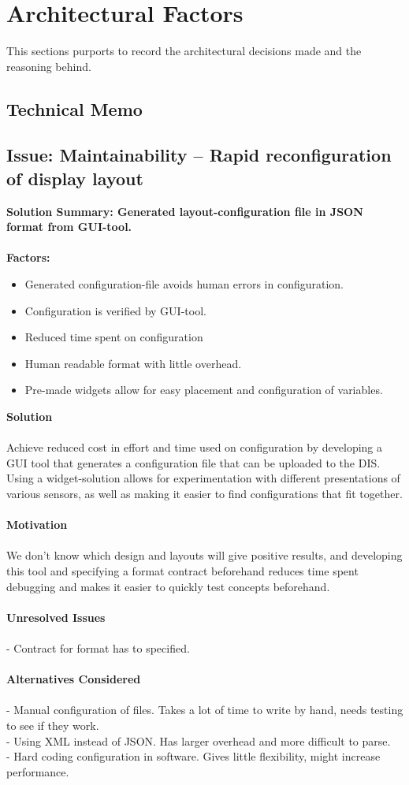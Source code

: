 
\section{Architectural Factors}

This sections purports to record the architectural decisions made and the
reasoning behind.

\subsection*{Technical Memo}
\subsection{Issue: Maintainability -- Rapid reconfiguration of display layout}
\textbf{Solution Summary: Generated layout-configuration file in JSON format
from GUI-tool.\\
\\
Factors:}
\begin{itemize}
\item Generated configuration-file avoids human errors in configuration.
\item Configuration is verified by GUI-tool.
\item Reduced time spent on configuration
\item Human readable format with little overhead.
\item Pre-made widgets allow for easy placement and configuration of variables.
\end{itemize}
\textbf{Solution}\\
\\
Achieve reduced cost in effort and time used on configuration by developing a
GUI tool that generates a configuration file that can be uploaded to the DIS.
Using a widget-solution allows for experimentation with different presentations
of various sensors, as well as making it easier to find configurations that fit
together.\\
\\
\textbf{Motivation}\\
\\
We don't know which design and layouts will give positive results, and
developing this tool and specifying a format contract beforehand reduces time 
spent debugging and makes it easier to quickly test concepts beforehand.\\
\\
\textbf{Unresolved Issues}\\
\\
- Contract for format has to specified.\\
\\
\textbf{Alternatives Considered}\\
\\
- Manual configuration of files. Takes a lot of time to write by hand, needs 
testing to see if they work.\\
- Using XML instead of JSON. Has larger overhead and more difficult to parse.\\
- Hard coding configuration in software. Gives little flexibility,
might increase performance. 



